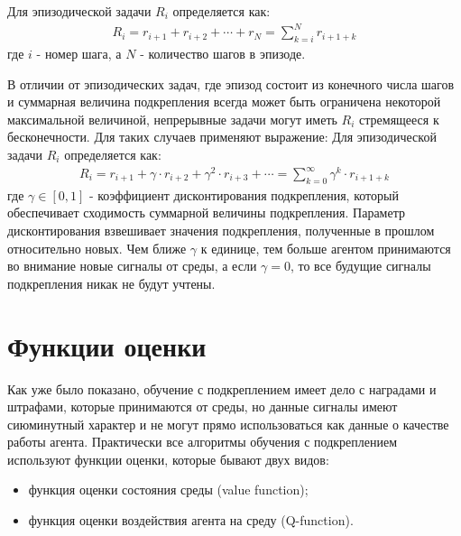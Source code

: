 Для эпизодической задачи $ R_i $ определяется как:
\begin{equation}
\label{eq:1_1p1}
\begin{alignedat}{2}
R_i=r_{i+1} + r_{i+2} + \cdots + r_N = \sum \limits_{k=i}^{N}r_{i+1+k} \end{alignedat}
\end{equation}
где $ i $ - номер шага, а $ N $ - количество шагов в эпизоде.

В отличии от эпизодических задач, где эпизод состоит из конечного числа шагов и суммарная величина подкрепления всегда может быть ограничена некоторой максимальной величиной, непрерывные задачи могут иметь $ R_i $ стремящееся к бесконечности. Для таких случаев применяют выражение:
Для эпизодической задачи $ R_i $ определяется как:
\begin{equation}
\label{eq:1_1p2}
\begin{alignedat}{2}
R_i=r_{i+1} + \gamma \cdot r_{i+2} + \gamma^2 \cdot r_{i+3} + \cdots = \sum \limits_{k=0}^{\infty}\gamma^k \cdot r_{i+1+k}
\end{alignedat}
\end{equation}
где $ \gamma \in [0, 1]$ - коэффициент дисконтирования подкрепления, который обеспечивает сходимость суммарной величины подкрепления.  
Параметр дисконтирования взвешивает значения подкрепления, полученные в прошлом относительно новых. Чем ближе $ \gamma $ к единице, тем больше агентом принимаются во внимание новые сигналы от среды, а если $ \gamma = 0 $, то все будущие сигналы подкрепления никак не будут учтены. 

\section{Функции оценки} \label{sect1_2}
Как уже было показано, обучение с подкреплением имеет дело с наградами и штрафами, которые принимаются от среды, но данные сигналы имеют сиюминутный характер и не могут прямо использоваться как данные о качестве работы агента. Практически все алгоритмы обучения с подкреплением используют функции оценки, которые бывают двух видов:
\begin{itemize}
	\item функция оценки состояния среды (value function);
	\item функция оценки воздействия агента на среду (Q-function).
\end{itemize}

